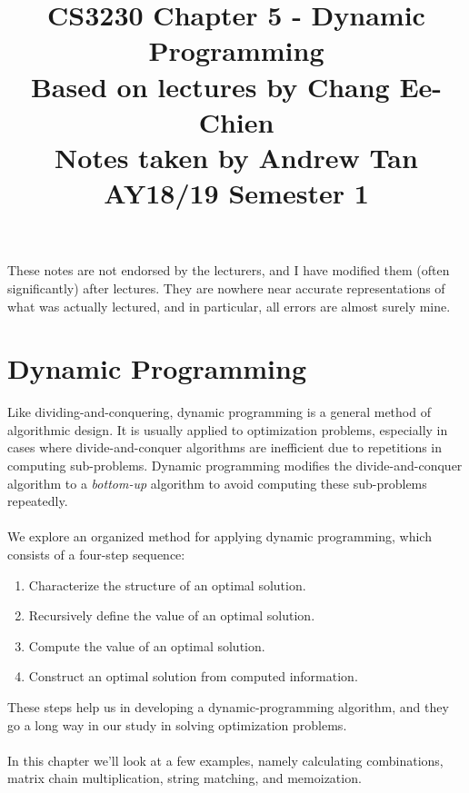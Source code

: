 \documentclass[a4paper]{article}
\title{%
	CS3230 Chapter 5 - Dynamic Programming \\
	\large Based on lectures by Chang Ee-Chien
	\\ Notes taken by Andrew Tan
	\\ AY18/19 Semester 1
	\\ }
\author{}
\date{\vspace{-5ex}}
\begin{document}
\maketitle

\begin{center}\begin{minipage}[c]{0.9\textwidth}\centering\footnotesize These notes are not endorsed by the lecturers, and I have modified them (often significantly) after lectures. They are nowhere near accurate representations of what was actually lectured, and in particular, all errors are almost surely mine.\end{minipage}\end{center}

\section{Dynamic Programming}
Like dividing-and-conquering, dynamic programming is a general method of algorithmic design. It is usually applied to optimization problems, especially in cases where divide-and-conquer algorithms are inefficient due to repetitions in computing sub-problems. Dynamic programming modifies the divide-and-conquer algorithm to a \textit{bottom-up} algorithm to avoid computing these sub-problems repeatedly.\\ \\
We explore an organized method for applying dynamic programming, which consists of a four-step sequence:
\begin{enumerate}
	\item Characterize the structure of an optimal solution.
	\item Recursively define the value of an optimal solution.
	\item Compute the value of an optimal solution.
	\item Construct an optimal solution from computed information.
\end{enumerate}
These steps help us in developing a dynamic-programming algorithm, and they go a long way in our study in solving optimization problems.\\ \\
In this chapter we'll look at a few examples, namely calculating combinations, matrix chain multiplication, string matching, and memoization.
\end{document}
